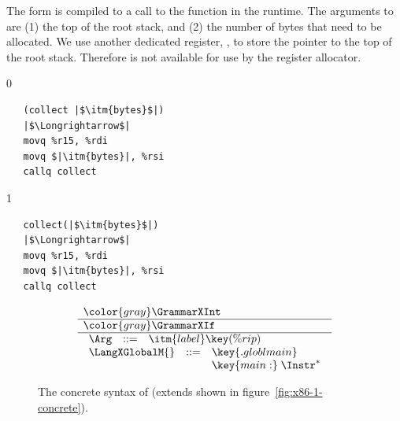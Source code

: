 \documentclass[7x10]{TimesAPriori_MIT}%
\newcommand{\gray}[1]{{\color{gray} #1}}
\def\racketEd{0}
\def\pythonEd{1}
\def\edition{1}
\newcommand{\pythonColor}[0]{}
\numberwithin{theorem}{chapter}
\numberwithin{definition}{chapter}
\numberwithin{equation}{chapter}
\begin{document}
%
The  form is compiled to a call to the 
function in the runtime. The arguments to  are (1) the
top of the root stack, and (2) the number of bytes that need to be
allocated.  We use another dedicated register, , to store
the pointer to the top of the root stack. Therefore  is not
available for use by the register allocator.
%
{\if\edition\racketEd
\begin{lstlisting}
   (collect |$\itm{bytes}$|)
   |$\Longrightarrow$|
   movq %r15, %rdi
   movq $|\itm{bytes}|, %rsi
   callq collect
\end{lstlisting}
\fi}
{\if\edition\pythonEd\pythonColor    
\begin{lstlisting}
   collect(|$\itm{bytes}$|)
   |$\Longrightarrow$|
   movq %r15, %rdi
   movq $|\itm{bytes}|, %rsi
   callq collect
\end{lstlisting}
\fi}


\newcommand{\GrammarXGlobal}{
\begin{array}{lcl}
  \Arg &::=& \itm{label} \key{(\%rip)} 
\end{array}
}

\newcommand{\ASTXGlobalRacket}{
\begin{array}{lcl}
  \Arg &::=&  \GLOBAL{\itm{label}} 
\end{array}
}


\begin{figure}[tp]
  \begin{tcolorbox}[colback=white]
\[
\begin{array}{l}
  \gray{\GrammarXInt} \\ \hline
  \gray{\GrammarXIf} \\ \hline
  \GrammarXGlobal \\
\begin{array}{lcl}
\LangXGlobalM{} &::= &  \key{.globl main} \\
      &    &  \key{main:} \; \Instr^{*} 
\end{array}
\end{array}
\]
  \end{tcolorbox}
\caption{The concrete syntax of \LangXGlobal{}  (extends \LangXIf{} shown in figure~\ref{fig:x86-1-concrete}).}
\label{fig:x86-2-concrete}
\end{figure}
\end{document}
